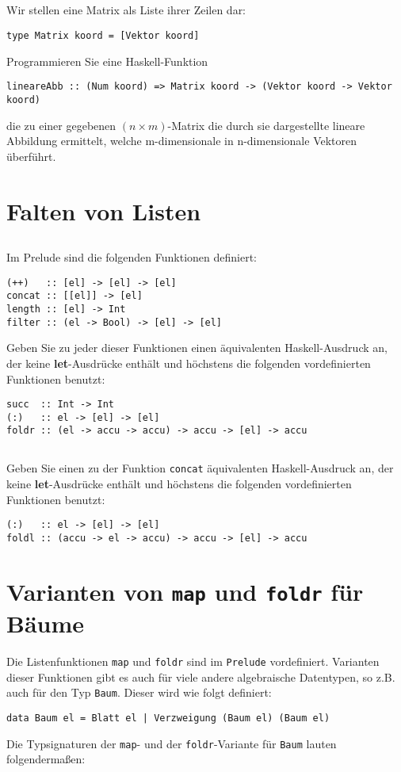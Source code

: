 \documentclass[
  10pt,                   %
  DIV12,
  german,                 %
  oneside,                %
  parskip=half,           %
  headings=normal,        %
  captions=tableheading,  %
]{scrartcl}
\begin{document}
\subsection{}
Wir stellen eine Matrix als Liste ihrer Zeilen dar:
\begin{center}
\lstinline!type Matrix koord = [Vektor koord]!
\end{center}
Programmieren Sie eine Haskell-Funktion
\begin{center}
\lstinline!lineareAbb :: (Num koord) => Matrix koord -> (Vektor koord -> Vektor koord)!
\end{center}

die zu einer gegebenen $(n \times m)$-Matrix die durch sie dargestellte lineare Abbildung
ermittelt, welche m-dimensionale in n-dimensionale Vektoren überführt.

\section{Falten von Listen}
\subsection{}
Im Prelude sind die folgenden Funktionen definiert:
\begin{lstlisting}
(++)   :: [el] -> [el] -> [el]
concat :: [[el]] -> [el]
length :: [el] -> Int
filter :: (el -> Bool) -> [el] -> [el]
\end{lstlisting}
Geben Sie zu jeder dieser Funktionen einen äquivalenten Haskell-Ausdruck an,
der keine \textbf{let}-Ausdrücke enthält und höchstens die folgenden vordefinierten
Funktionen benutzt:
\begin{lstlisting}
succ  :: Int -> Int
(:)   :: el -> [el] -> [el]
foldr :: (el -> accu -> accu) -> accu -> [el] -> accu
\end{lstlisting}
\subsection{}
Geben Sie einen zu der Funktion \lstinline|concat| äquivalenten Haskell-Ausdruck an, der keine
\textbf{let}-Ausdrücke enthält und höchstens die folgenden vordefinierten Funktionen
benutzt:
\begin{lstlisting}
(:)   :: el -> [el] -> [el]
foldl :: (accu -> el -> accu) -> accu -> [el] -> accu
\end{lstlisting}
\section{Varianten von \lstinline|map| und \lstinline|foldr| für Bäume}
Die Listenfunktionen \lstinline|map| und \lstinline|foldr| sind im \lstinline|Prelude| vordefiniert. Varianten dieser
Funktionen gibt es auch für viele andere algebraische Datentypen, so z.B. auch für den
Typ \lstinline|Baum|. Dieser wird wie folgt definiert:
\begin{center}
\lstinline!data Baum el = Blatt el | Verzweigung (Baum el) (Baum el)!
\end{center}
Die Typsignaturen der \lstinline|map|- und der \lstinline|foldr|-Variante für \lstinline|Baum| lauten folgendermaßen:
\end{document}
